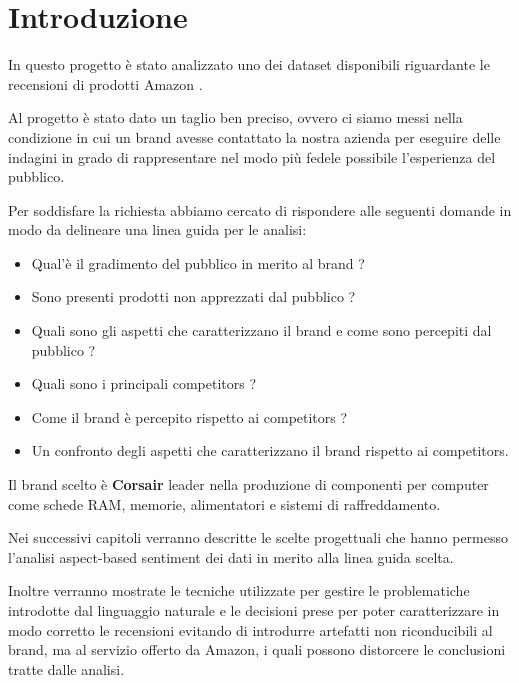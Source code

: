 \section{Introduzione}
In questo progetto è stato analizzato uno dei dataset disponibili riguardante le recensioni di prodotti Amazon \cite{ni2019justifying}.

Al progetto è stato dato un taglio ben preciso, ovvero ci siamo messi nella condizione in cui un brand avesse contattato la nostra azienda per eseguire delle indagini in grado di rappresentare nel modo più fedele possibile l'esperienza del pubblico.

Per soddisfare la richiesta abbiamo cercato di rispondere alle seguenti domande in modo da delineare una linea guida per le analisi: 

\begin{itemize}
\item Qual'è il gradimento del pubblico in merito al brand ?
\item Sono presenti prodotti non apprezzati dal pubblico ?
\item Quali sono gli aspetti che caratterizzano il brand e come sono percepiti dal pubblico ?  
\item Quali sono i principali competitors ? 
\item Come il brand è percepito rispetto ai competitors ?
\item Un confronto degli aspetti che caratterizzano il brand rispetto ai competitors.
\label{domande-iniziali}
\end{itemize}

Il brand scelto è \textbf{Corsair} leader nella produzione di componenti per computer come schede RAM, memorie, alimentatori e sistemi di raffreddamento.

Nei successivi capitoli verranno descritte le scelte progettuali che hanno permesso l'analisi aspect-based sentiment dei dati in merito alla linea guida scelta.

Inoltre verranno mostrate le tecniche utilizzate per gestire le problematiche introdotte dal linguaggio naturale e le decisioni prese per poter caratterizzare in modo corretto le recensioni evitando di introdurre artefatti non riconducibili al brand, ma al servizio offerto da Amazon, i quali possono distorcere le conclusioni tratte dalle analisi.
